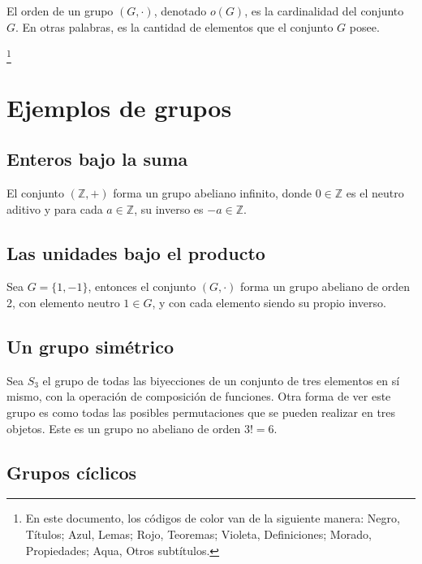 \documentclass{article}
\newcommand\blfootnote[1]{%
  \begingroup
  \renewcommand\thefootnote{}\footnote{#1}%
  \addtocounter{footnote}{-1}%
  \endgroup
}
\renewcommand{\headrulewidth}{2pt}
\begin{document}
El orden de un grupo $(G,\cdot)$, denotado $o(G)$, es la cardinalidad del conjunto $G$. En otras palabras, es la cantidad de elementos que el conjunto $G$ posee.

\blfootnote{En este documento, los códigos de color van de la siguiente manera: Negro, Títulos; \color{blue} Azul, Lemas; \color{red} Rojo, Teoremas; \color{violet} Violeta, Definiciones; \color{purple} Morado, Propiedades; \color{teal} Aqua, Otros subtítulos.}

\newpage
\pagestyle{fancy}
\fancyhf{}
\renewcommand{\headrulewidth}{2pt}
\fancyfoot{}
\rfoot{\thepage}
\lfoot{}
\setlength{\headheight}{28pt}

\section{Ejemplos de grupos}

\subsection*{\color{teal} Enteros bajo la suma}

El conjunto $(\mathbb{Z},+)$ forma un grupo abeliano infinito, donde $0\in\mathbb{Z}$ es el neutro aditivo y para cada $a\in\mathbb{Z}$, su inverso es $-a\in\mathbb{Z}$.

\subsection*{\color{teal} Las unidades bajo el producto}

Sea $G=\{1,-1\}$, entonces el conjunto $(G,\cdot)$ forma un grupo abeliano de orden 2, con elemento neutro $1\in G$, y con cada elemento siendo su propio inverso.

\subsection*{\color{teal} Un grupo simétrico}

Sea $S_3$ el grupo de todas las biyecciones de un conjunto de tres elementos en sí mismo, con la operación de composición de funciones. Otra forma de ver este grupo es como todas las posibles permutaciones que se pueden realizar en tres objetos. Este es un grupo no abeliano de orden $3!=6$.

\subsection*{\color{teal} Grupos cíclicos}
\end{document}
